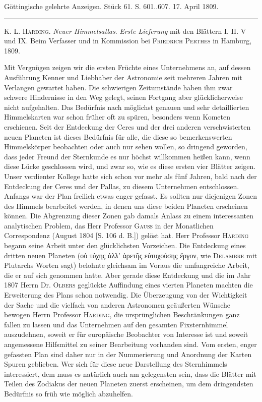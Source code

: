 \clearpage
{}
\begin{center}\small Göttingische gelehrte Anzeigen. Stück 61. S. 601..607. 17. April 1809.\\[3pt]\rule{.72\linewidth}{.3pt}\end{center}

\textsc{K. L. Harding}. \emph{Neuer Himmelsatlas}. \emph{Erste Lieferung} mit den Blättern I. II. V und IX. Beim Verfasser und in Kommission bei \textsc{Friedrich Perthes} in Hamburg, 1809.

Mit Vergnügen zeigen wir die ersten Früchte eines Unternehmens an, auf dessen Ausführung Kenner und Liebhaber der Astronomie seit mehreren Jahren mit Verlangen gewartet haben. Die schwierigen Zeitumstände haben ihm zwar schwere Hindernisse in den Weg gelegt, seinen Fortgang aber glücklicherweise nicht aufgehalten. Das Bedürfnis nach möglichst genauen und sehr detaillierten Himmelskarten war schon früher oft zu spüren, besonders wenn Kometen erschienen. Seit der Entdeckung der Ceres und der drei anderen verschwisterten neuen Planeten ist dieses Bedürfnis für alle, die diese so bemerkenswerten Himmelskörper beobachten oder auch nur sehen wollen, so dringend geworden, dass jeder Freund der Sternkunde es nur höchst willkommen heißen kann, wenn diese Lücke geschlossen wird, und zwar so, wie es diese ersten vier Blätter zeigen. Unser verdienter Kollege hatte sich schon vor mehr als fünf Jahren, bald nach der Entdeckung der Ceres und der Pallas, zu diesem Unternehmen entschlossen. Anfangs war der Plan freilich etwas enger gefasst. Es sollten nur diejenigen Zonen des Himmels bearbeitet werden, in denen uns diese beiden Planeten erscheinen können. Die Abgrenzung dieser Zonen gab damals Anlass zu einem interessanten analytischen Problem, das Herr Professor \textsc{Gauss} in der Monatlichen Correspondenz (August 1804 [S. 106 d. B.]) gelöst hat. Herr Professor \textsc{Harding} begann seine Arbeit unter den glücklichsten Vorzeichen. Die Entdeckung eines dritten neuen Planeten ({\LatitudeSymbols οὐ τύχης ἀλλ' ἀρετῆς εὐτυχούσης ἔργον}, wie \textsc{Delambre} mit Plutarchs Worten sagt) belohnte gleichsam im Voraus die umfangreiche Arbeit, die er auf sich genommen hatte. Aber gerade diese Entdeckung und die im Jahr 1807 Herrn Dr. \textsc{Olbers} geglückte Auffindung eines vierten Planeten machten die Erweiterung des Plans schon notwendig. Die Überzeugung von der Wichtigkeit der Sache und die vielfach von anderen Astronomen geäußerten Wünsche bewogen Herrn Professor \textsc{Harding}, die ursprünglichen Beschränkungen ganz fallen zu lassen und das Unternehmen auf den gesamten Fixsternhimmel auszudehnen, soweit er für europäische Beobachter von Interesse ist und soweit angemessene Hilfsmittel zu seiner Bearbeitung vorhanden sind. Vom ersten, enger gefassten Plan sind daher nur in der Nummerierung und Anordnung der Karten Spuren geblieben. Wer sich für diese neue Darstellung des Sternhimmels interessiert, dem muss es natürlich auch am gelegensten sein, dass die Blätter mit Teilen des Zodiakus der neuen Planeten zuerst erscheinen, um dem dringendsten Bedürfnis so früh wie möglich abzuhelfen.

